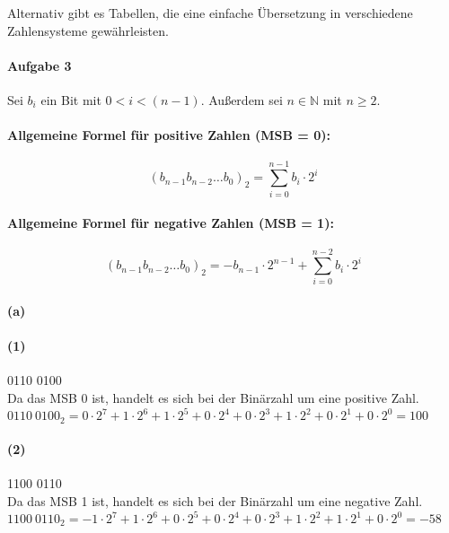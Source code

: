 \documentclass[12pt, letterpaper]{article}
\begin{document}
\noindent Alternativ gibt es Tabellen, die eine einfache Übersetzung in verschiedene Zahlensysteme gewährleisten.

\paragraph{Aufgabe 3}

\noindent Sei $b_i$ ein Bit mit $0 < i < (n - 1)$. Außerdem sei $n \in \mathbb{N}$ mit $n \geq 2$. 

\paragraph{Allgemeine Formel für positive Zahlen (MSB = 0):}
\[
(b_{n-1}b_{n-2}\dots b_0)_2 = \sum_{i=0}^{n-1} b_i \cdot 2^i
\]

\paragraph{Allgemeine Formel für negative Zahlen (MSB = 1):}
\[
(b_{n-1}b_{n-2}\dots b_0)_2 = -b_{n-1} \cdot 2^{n-1} + \sum_{i=0}^{n-2} b_i \cdot 2^i
\]

\paragraph{(a)}

\paragraph{(1)}

0110 0100\\

\noindent Da das MSB 0 ist, handelt es sich bei der Binärzahl um eine positive Zahl.\\

\noindent $0110\ 0100_2 = 0 \cdot 2^7 + 1 \cdot 2^6 + 1 \cdot 2^5 + 0 \cdot 2^4 + 0 \cdot 2^3 + 1 \cdot 2^2 + 0 \cdot 2^1 + 0 \cdot 2^0 = 100$ 

\paragraph{(2)}

1100 0110\\

\noindent Da das MSB 1 ist, handelt es sich bei der Binärzahl um eine negative Zahl.\\

\noindent $1100\ 0110_2 = -1 \cdot 2^7 + 1 \cdot 2^6 + 0 \cdot 2^5 + 0 \cdot 2^4 + 0 \cdot 2^3 + 1 \cdot 2^2 + 1 \cdot 2^1 + 0 \cdot 2^0 = -58$
\end{document}
